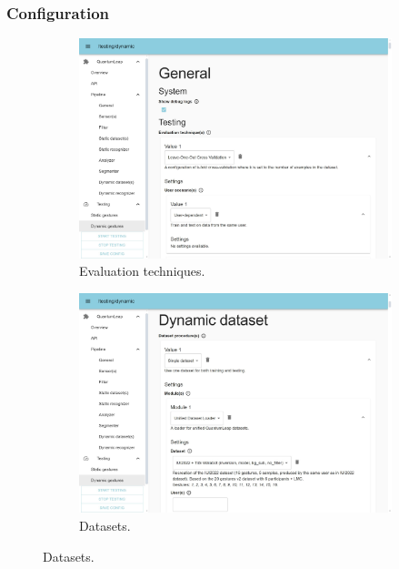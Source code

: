 \subsubsection{Configuration} \label{sec:quantumleap-testing:description:ql-integration:configuration}

\begin{figure}[bt]
  \centering
  \begin{subfigure}{.49\textwidth}
      \centering
      \includegraphics[width=\linewidth]{Figures/QuantumLeapTesting/QL-Testing-EvaluationTechnique.pdf}  
      \vspace{-15pt}
      \captionsetup{width=.9\linewidth}
      \caption{Evaluation techniques.}
      \label{fig:quantumleap-testing:ui:1}
  \end{subfigure}
  \begin{subfigure}{.49\textwidth}
      \centering
      \includegraphics[width=\linewidth]{Figures/QuantumLeapTesting/QL-Testing-Dataset.pdf}  
      \vspace{-15pt}
      \captionsetup{width=.9\linewidth}
      \caption{Datasets.}
      \label{fig:quantumleap-testing:ui:2}
  \end{subfigure}
  

\end{figure}
